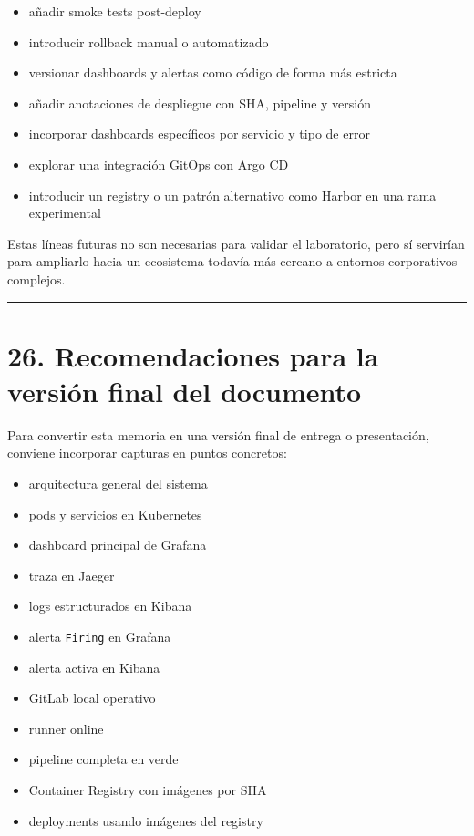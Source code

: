 \documentclass[
a4paper,
12pt]{report}
\providecommand{\tightlist}{%
  \setlength{\itemsep}{0pt}\setlength{\parskip}{0pt}}
\begin{document}
\begin{itemize}
\tightlist
\item
  añadir smoke tests post-deploy
\item
  introducir rollback manual o automatizado
\item
  versionar dashboards y alertas como código de forma más estricta
\item
  añadir anotaciones de despliegue con SHA, pipeline y versión
\item
  incorporar dashboards específicos por servicio y tipo de error
\item
  explorar una integración GitOps con Argo CD
\item
  introducir un registry o un patrón alternativo como Harbor en una rama
  experimental
\end{itemize}

Estas líneas futuras no son necesarias para validar el laboratorio, pero
sí servirían para ampliarlo hacia un ecosistema todavía más cercano a
entornos corporativos complejos.

\begin{center}\rule{0.5\linewidth}{0.5pt}\end{center}

\chapter{26. Recomendaciones para la versión final del
documento}\label{recomendaciones-para-la-versiuxf3n-final-del-documento}

Para convertir esta memoria en una versión final de entrega o
presentación, conviene incorporar capturas en puntos concretos:

\begin{itemize}
\tightlist
\item
  arquitectura general del sistema
\item
  pods y servicios en Kubernetes
\item
  dashboard principal de Grafana
\item
  traza en Jaeger
\item
  logs estructurados en Kibana
\item
  alerta \texttt{Firing} en Grafana
\item
  alerta activa en Kibana
\item
  GitLab local operativo
\item
  runner online
\item
  pipeline completa en verde
\item
  Container Registry con imágenes por SHA
\item
  deployments usando imágenes del registry
\end{itemize}
\end{document}
